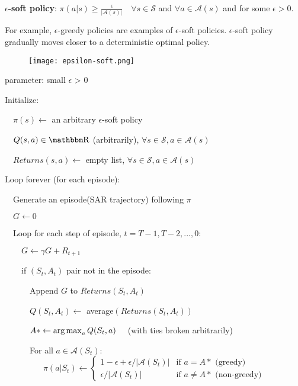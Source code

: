 \documentclass[sutton_barto_notes.tex]{subfiles}
\begin{document}
\begin{definition}
\textbf{$\epsilon$-soft policy}: $\pi(a|s) \geq \frac{\epsilon}{|\mathcal{A}(s)|} \quad \forall s \in \mathcal{S}$ and $\forall a \in \mathcal{A}(s)$ and for some $\epsilon > 0$.
\end{definition}

For example, $\epsilon$-greedy policies are examples of $\epsilon$-soft policies. 
$\epsilon$-soft policy gradually moves closer to a deterministic optimal policy.

\begin{figure}[!h]
  \centering
  \texttt{[image: epsilon-soft.png]}
  \label{fig:GPI}
\end{figure}

\begin{tcolorbox}[width=1.1\textwidth,title={On-policy first-visit MC control, estimates $V \approx v_\pi$}]
parameter: small $\epsilon$ > 0

Initialize:

$\quad \pi(s) \leftarrow$ an arbitrary $\epsilon$-soft policy

$\quad Q(s,a) \in \R$ (arbitrarily), $\forall s \in \mathcal{S}, a \in \mathcal{A}(s)$

$\quad Returns(s,a) \leftarrow$ empty list, $\forall s \in \mathcal{S}, a \in \mathcal{A}(s)$

Loop forever (for each episode):

$\quad$Generate an episode(SAR trajectory) following $\pi$

$\quad G \leftarrow 0$

$\quad$Loop for each step of episode, $t = T-1, T-2, ..., 0$:

$\quad\quad G\leftarrow \gamma G + R_{t+1}$

$\quad\quad$if $(S_t, A_t)$ pair not in the episode:

$\quad\quad\quad$Append $G$ to $Returns(S_t, A_t)$

$\quad\quad\quad Q(S_t, A_t) \leftarrow$ average$(Returns(S_t, A_t))$

$\quad\quad\quad A* \leftarrow \operatorname*{arg\,max}_a Q(S_t, a) \quad$ (with ties broken arbitrarily)

$\quad\quad\quad$For all $a \in \mathcal{A}(S_t):$
$\quad\quad\quad\quad$ \begin{equation}
  \pi(a|S_t) \leftarrow
    \begin{cases}
      1 - \epsilon + \epsilon / |\mathcal{A}(S_t)| & \text{if $a = A*$ (greedy)}\\
      \epsilon / |\mathcal{A}(S_t)| & \text{if $a \neq A*$ (non-greedy)}
    \end{cases}       
\end{equation}
\end{tcolorbox}
\end{document}
